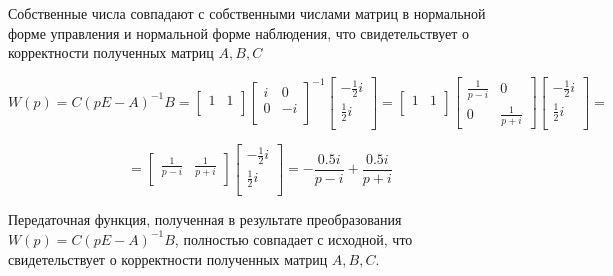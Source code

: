 \documentclass[14pt,a4paper,report]{report}
\begin{document}
Собственные числа совпадают с собственными числами матриц в нормальной форме управления и нормальной форме наблюдения, что свидетельствует о корректности полученных матриц  $A, B, C$

\begin{equation*}
\text{$W(p)=C(pE-A)^{-1}B=
	\begin{bmatrix}
	1 & 1 \\
	\end{bmatrix}
	\begin{bmatrix}
	i & 0 \\
	0 & -i\\
	\end{bmatrix}^{-1}
	\begin{bmatrix}
	-\frac{1}{2}i \\
	 \frac{1}{2}i \\
	\end{bmatrix}=
	\begin{bmatrix}
	1 & 1 \\
	\end{bmatrix}
	\begin{bmatrix}
	\frac{1}{p - i} & 0 \\
	0 & \frac{1}{p + i}
	\end{bmatrix}
	\begin{bmatrix}
	-\frac{1}{2}i \\
	 \frac{1}{2}i \\	\end{bmatrix}=
	$}
\end{equation*}

\begin{equation*}
\text{$=\begin{bmatrix}
	\frac{1}{p - i} & \frac{1}{p + i} \\
	\end{bmatrix}\begin{bmatrix}
	-\frac{1}{2}i \\
	 \frac{1}{2}i \\	
	 \end{bmatrix}= -\frac{0.5i}{p - i} + \frac{0.5i}{p + i}
	$}
\end{equation*}

Передаточная функция, полученная в результате преобразования $W(p)=C(pE-A)^{-1}B$, полностью совпадает с исходной, что свидетельствует о корректности полученных матриц  $A, B, C$. 


\end{document}
